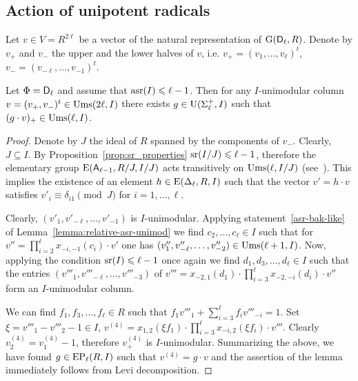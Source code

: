 \subsection{Action of unipotent radicals}\label{sec:ur-action}
Let $v\in V=R^{2\ell}$ be a vector of the natural representation of $\operatorname{G}(\mathsf{D}_\ell, R)$.
Denote by $v_+$ and $v_-$ the upper and the lower halves of $v$, i.e. $v_+=(v_1,\ldots, v_\ell)^t$, $v_-=(v_{-\ell},\ldots, v_{-1})^t$.
\begin{lemma}\label{lemma:asrUnip}
 Let $\Phi=\mathsf{D}_\ell$ and assume that $\operatorname{asr}(I)\leqslant \ell -1$. 
 Then for any $I$-unimodular column $v=(v_+, v_-)^t\in\operatorname{Ums}(2\ell, I)$
 there exists $g\in\operatorname{U}(\Sigma^+_\ell, I)$ such that $(g \cdot v)_+ \in \operatorname{Ums}(\ell, I)$.
\end{lemma}
\begin{proof} Denote by $J$ the ideal of $R$ spanned by the components of $v_{-}$. Clearly, $J \subseteq I$.
By Proposition~\ref{prop:sr_properties} $\operatorname{sr}(I/J) \leqslant \ell-1$, therefore
the elementary group $\operatorname{E}(\mathsf{A}_{\ell-1}, R/J, I/J)$ acts transitively on $\operatorname{Ums}(\ell, I/J)$ (see~\cite[Theorem~2.3c]{Va69}). 
This implies the existence of an element $h\in \operatorname{E}(\Delta_\ell, R, I)$ such that the vector $v' = h \cdot v$ satisfies $v'_i \equiv \delta_{i1} \pmod J$ for $i=1,\ldots, \ell$.

Clearly, $(v'_1,v'_{-\ell},\ldots, v'_{-1})$ is $I$-unimodular.
Applying statement~\ref{asr-bak-like} of Lemma~\ref{lemma:relative-asr-unimod} we find $c_2,\ldots, c_\ell\in I$ such that for $v''= \prod_{i=2}^{\ell}x_{-i, -1}(c_i)\cdot v'$ one has
$(v''_1, v''_{-\ell},\ldots, v''_{-2})\in\operatorname{Ums}(\ell+1, I)$.
Now, applying the condition $\operatorname{sr}(I) \leqslant \ell-1$ once again we find
$d_1,d_3,\ldots, d_{\ell}\in I$ such that the entries $(v'''_1, v'''_{-\ell},\ldots, v'''_{-3})$
of $v'''=x_{-2,1}(d_1) \cdot \prod_{i=3}^{\ell} x_{-2,-i}(d_i) \cdot v''$ form an $I$-unimodular column.

We can find $f_1, f_3,\ldots, f_\ell \in R$ such that $f_1v'''_1+\sum_{i=3}^\ell f_i v'''_{-i} = 1$.
Set $\xi = v'''_1-v'''_2-1 \in I$, $v^{(4)}=x_{1,2}(\xi f_1) \cdot \prod_{i=3}^\ell x_{-i,2}(\xi f_i) \cdot v'''$.
Clearly $v^{(4)}_2 = v^{(4)}_1-1$, therefore $v^{(4)}_+$ is $I$-unimodular.
Summarizing the above, we have found $g\in \operatorname{EP}_\ell(R, I)$ such that $v^{(4)}=g \cdot v$
and the assertion of the lemma immediately follows from Levi decomposition. \end{proof}

